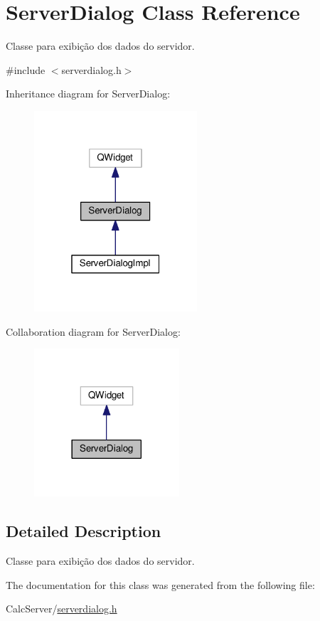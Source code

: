 \hypertarget{classServerDialog}{}\section{Server\+Dialog Class Reference}
\label{classServerDialog}


Classe para exibição dos dados do servidor.  




{\ttfamily \#include $<$serverdialog.\+h$>$}



Inheritance diagram for Server\+Dialog\+:\nopagebreak
\begin{figure}[H]
\begin{center}
\leavevmode
\includegraphics[width=172pt]{d2/d7c/classServerDialog__inherit__graph}
\end{center}
\end{figure}


Collaboration diagram for Server\+Dialog\+:\nopagebreak
\begin{figure}[H]
\begin{center}
\leavevmode
\includegraphics[width=153pt]{da/d23/classServerDialog__coll__graph}
\end{center}
\end{figure}


\subsection{Detailed Description}
Classe para exibição dos dados do servidor. 

The documentation for this class was generated from the following file\+:\begin{DoxyCompactItemize}
\item 
Calc\+Server/\hyperlink{serverdialog_8h}{serverdialog.\+h}\end{DoxyCompactItemize}
